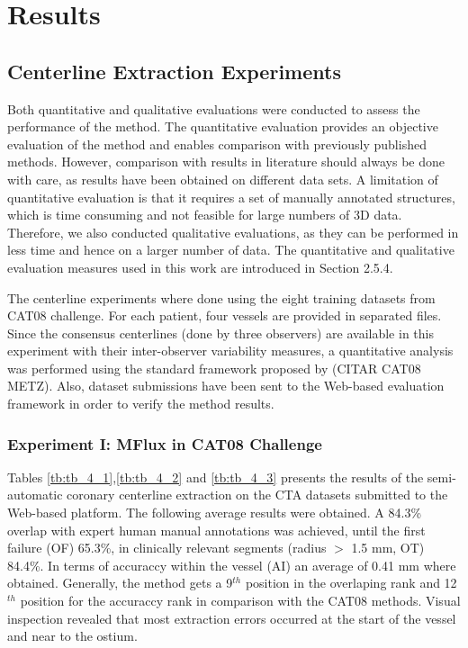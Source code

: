 \chapter{Results}
%

\section{Centerline Extraction Experiments}

Both quantitative and qualitative evaluations were conducted to assess the performance of the method. The quantitative evaluation provides an objective evaluation of the method and enables comparison with previously published methods. However, comparison with results in literature should always be done with care, as results have been obtained on different data sets. A limitation of quantitative evaluation is that it requires a set of manually annotated structures, which is time consuming and not feasible for large numbers of 3D data. Therefore, we also conducted qualitative evaluations, as they can be performed in less time and hence on a larger number of data. The quantitative and qualitative evaluation measures used in this work are introduced in Section 2.5.4.

The centerline experiments where done using the eight training datasets from CAT08 challenge. For each patient, four vessels are provided in separated files. Since the consensus centerlines (done by three observers) are available in this experiment with their inter-observer variability measures, a quantitative analysis was performed using the standard framework proposed by (CITAR CAT08 METZ). Also, dataset submissions have been sent to the Web-based evaluation framework in order to verify the method results.

\subsection{Experiment I: MFlux in CAT08 Challenge}

Tables \ref{tb:tb_4_1},\ref{tb:tb_4_2} and \ref{tb:tb_4_3}  presents the results of the semi-automatic coronary centerline extraction on the CTA datasets submitted to the Web-based platform. The following average results were obtained. A 84.3\% overlap with expert human manual annotations was achieved, until the first failure (OF) 65.3\%, in clinically relevant segments (radius $>$ 1.5 mm, OT) 84.4\%. In terms of accuraccy within the vessel (AI) an average of 0.41 mm where obtained. Generally, the method gets a 9$^{th}$ position in the overlaping rank and 12$^{th}$ position for the accuraccy rank in comparison with the CAT08 methods. Visual inspection revealed that most extraction errors occurred at the start of the vessel and near to the ostium. 

